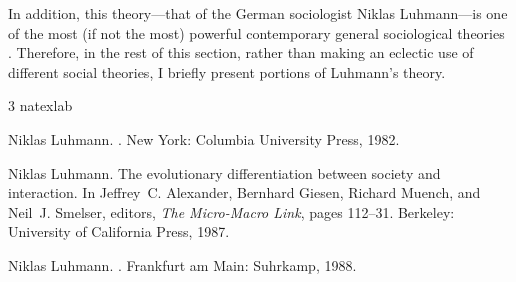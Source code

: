 \documentclass{article}
\begin{document}
In addition, this theory---that of the German sociologist Niklas
Luhmann---is one
of the most (if not the most) powerful
contemporary general sociological theories
\citep{luhm:DoS,Luhm:Soc&int,luhm:WrtdG}.  Therefore, in the rest of
this section, rather than making an eclectic use of different social
theories, I briefly present portions of Luhmann's theory.

\begin{thebibliography}{3}
\expandafter\ifx\csname natexlab\endcsname\relax\def\natexlab#1{#1}\fi

Niklas Luhmann.
.
\newblock New York: Columbia University Press, 1982.

Niklas Luhmann.
\newblock The evolutionary differentiation between society and interaction.
\newblock In Jeffrey~C. Alexander, Bernhard Giesen, Richard Muench, and Neil~J.
  Smelser, editors, {\em The Micro-Macro Link}, pages 112--31. Berkeley:
  University of California Press, 1987.

Niklas Luhmann.
.
\newblock Frankfurt am Main: Suhrkamp, 1988.

\end{thebibliography}
\end{document}
